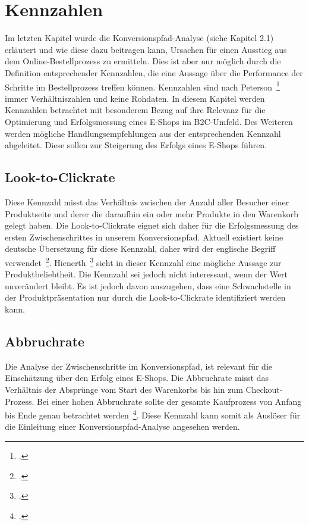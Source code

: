 \newpage
\section{Kennzahlen}
Im letzten Kapitel wurde die Konversionspfad-Analyse (siehe Kapitel 2.1) erläutert und wie diese dazu beitragen kann, Ursachen für einen Ausstieg aus dem Online-Bestellprozess zu ermitteln. Dies ist aber nur möglich durch die Definition entsprechender Kennzahlen, die eine Aussage über die Performance der Schritte im Bestellprozess treffen können. Kennzahlen sind nach Peterson~\footcite[Vgl. ][Seite 8]{website:webanalyticsdemystified:ebook} immer Verhältniszahlen und keine Rohdaten. In diesem Kapitel werden Kennzahlen betrachtet mit besonderem Bezug auf ihre Relevanz für die Optimierung und Erfolgsmessung eines E-Shops im B2C-Umfeld. Des Weiteren werden mögliche Handlungsempfehlungen aus der entsprechenden Kennzahl abgeleitet. Diese sollen zur Steigerung des Erfolgs eines E-Shops führen. 

\subsection{Look-to-Clickrate}
Diese Kennzahl misst das Verhältnis zwischen der Anzahl aller Besucher einer Produktseite und derer die daraufhin ein oder mehr Produkte in den Warenkorb gelegt haben. Die Look-to-Clickrate eignet sich daher für die Erfolgsmessung des ersten Zwischenschrittes in unserem Konversionspfad. Aktuell existiert keine deutsche Übersetzung für diese Kennzahl, daher wird der englische Begriff verwendet~\footcite[Vgl. ][Seite 99]{Hienerth.2010}. Hienerth~\footcite[Vgl. ][Seite 110]{Hienerth.2010} sieht in dieser Kennzahl eine mögliche Aussage zur Produktbeliebtheit. Die Kennzahl sei jedoch nicht interessant, wenn der Wert unverändert bleibt. Es ist jedoch davon auszugehen, dass eine Schwachstelle in der Produktpräsentation nur durch die Look-to-Clickrate identifiziert werden kann.

\subsection{Abbruchrate}
Die Analyse der Zwischenschritte im Konversionspfad, ist relevant für die Einschätzung über den Erfolg eines E-Shops. Die Abbruchrate misst das Verhältnis der Absprünge vom Start des Warenkorbs bis hin zum Checkout-Prozess. Bei einer hohen Abbruchrate sollte der gesamte Kaufprozess von Anfang bis Ende genau betrachtet werden~\footcite[Vgl. ][Seite 377]{Kaushik.2007}. Diese Kennzahl kann somit als Auslöser für die Einleitung einer Konversionspfad-Analyse angesehen werden.

